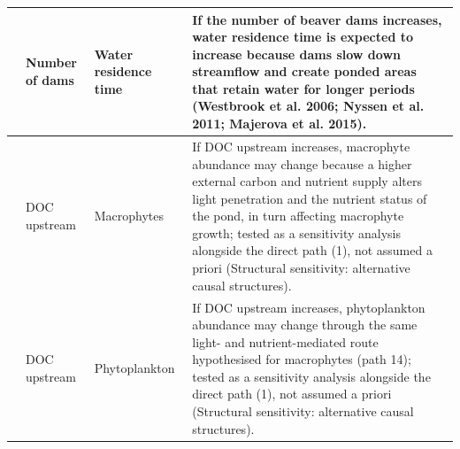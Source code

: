 \documentclass[11pt,a4paper]{article}
\begin{document}
\begin{longtable}{|>{\centering\arraybackslash}p{}|>{\raggedright\arraybackslash}p{}|>{\raggedright\arraybackslash}p{}|>{\raggedright\arraybackslash}p{}|}
13 & Number of dams & Water residence time & If the number of beaver dams increases, water residence time is expected to increase because dams slow down streamflow and create ponded areas that retain water for longer periods (Westbrook et al. 2006; Nyssen et al. 2011; Majerova et al. 2015). \\ \hline
14 & DOC upstream & Macrophytes & If DOC upstream increases, macrophyte abundance may change because a higher external carbon and nutrient supply alters light penetration and the nutrient status of the pond, in turn affecting macrophyte growth; tested as a sensitivity analysis alongside the direct path (1), not assumed a priori (Structural sensitivity: alternative causal structures). \\ \hline
15 & DOC upstream & Phytoplankton & If DOC upstream increases, phytoplankton abundance may change through the same light- and nutrient-mediated route hypothesised for macrophytes (path 14); tested as a sensitivity analysis alongside the direct path (1), not assumed a priori (Structural sensitivity: alternative causal structures). \\ \hline
\end{longtable}
\renewcommand{\arraystretch}{1}\endgroup

\FloatBarrier
\end{document}
